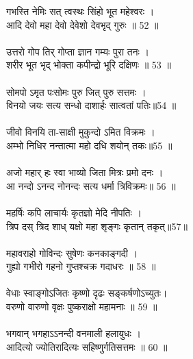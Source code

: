 गभस्ति नेमिः सत् त्वस्थः सिंहो भूत महेश्वरः ।\\
आदि देवो महा देवो देवेशो देवभृद् गुरुः ॥ 52 ॥\\
\\
उत्तरो गोप तिर् गोप्ता ज्ञान गम्यः पुरा तनः ।\\
शरीर भूत भृद् भोक्ता कपीन्द्रो भूरि दक्षिणः ॥ 53 ॥\\
\\
सोमपो ऽमृत पःसोमः पुरु जित् पुरु सत्तमः ।\\
विनयो जयः सत्य सन्धो दाशार्हः सात्वतां पतिः॥54 ॥\\
\\
जीवो विनयि ता-साक्षी मुकुन्दो ऽमित विक्रमः ।\\
अम्भो निधिर नन्तात्मा महो दधि शयोन् तकः॥55 ॥\\
\\
अजो महार् हः स्वा भाव्यो जिता मित्रः प्रमो दनः ।\\
आ नन्दो ऽनन्द नोनन्दः सत्य धर्मा त्रिविक्रमः॥ 56 ॥\\
\\
महर्षिः कपि लाचार्यः कृतज्ञो मेदि नीपतिः ।\\
त्रिप दस् त्रिद शाध् यक्षो महा शृङ्गः कृतान् तकृत्॥57॥\\
\\
महावराहो गोविन्दः सुषेणः कनकाङ्गदी ।\\
गुह्यो गभीरो गहनो गुप्तश्चक्र गदाधरः ॥ 58 ॥\\
\\
वेधाः स्वाङ्गोऽजितः कृष्णो दृढः सङ्कर्षणोऽच्युतः।\\
वरुणो वारुणो वृक्षः पुष्कराक्षो महामनाः ॥ 59 ॥\\
\\
भगवान् भगहाऽऽनन्दी वनमाली हलायुधः ।\\
आदित्यो ज्योतिरादित्यः सहिष्णुर्गतिसत्तमः ॥ 60 ॥\\
